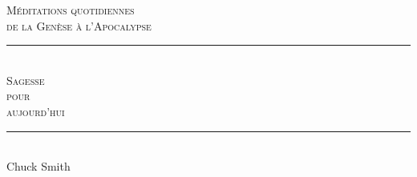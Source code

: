 
\newcommand{\HRule}{\rule{\linewidth}{0.2mm}}

\begin{titlepage}
\begin{center}
\mbox{}
\vfill
\textsc{\large Méditations quotidiennes\\de la Genèse à l'Apocalypse}
\\[1.5cm]
\HRule \\[0.4cm]
\textsc{ \Huge Sagesse\\ pour\\[0.4cm] aujourd'hui}\\[0.4cm]

\HRule \\[1.5cm]
{\LARGE Chuck Smith}\\[1.5cm]
\vfill
\mbox{}
\end{center}
\end{titlepage}

